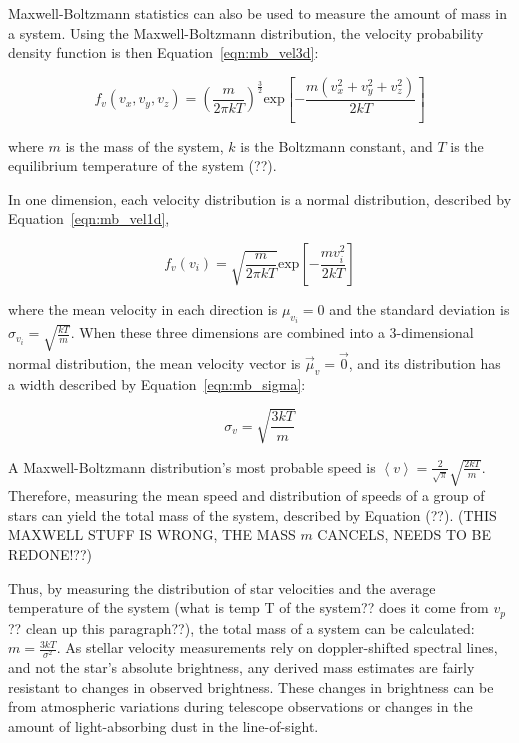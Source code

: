     Maxwell-Boltzmann statistics can also be used to measure the amount of mass in a system.
    Using the Maxwell-Boltzmann distribution, the velocity probability density function is then Equation~\ref{eqn:mb_vel3d}:

    \begin{equation}\label{eqn:mb_vel3d}
      f_v(v_x,v_y,v_z)= \left ( \frac{m}{2\pi k T} \right ) ^ { \frac{3}{2} } \text{exp} \left [ - \frac{m \left ( v_x^2 + v_y^2 + v_z^2 \right )}{2 k T} \right ]
    \end{equation}

    where $m$ is the mass of the system, $k$ is the Boltzmann constant, and $T$ is the equilibrium temperature of the system {\color{red}(??)}.
    
    In one dimension, each velocity distribution is a normal distribution, described by Equation~\ref{eqn:mb_vel1d},

    \begin{equation}\label{eqn:mb_vel1d}
      f_v(v_i) = \sqrt{ \frac{m}{2\pi k T} } \text{exp} \left [ - \frac{m v_i^2}{2kT} \right ]
    \end{equation}

    where the mean velocity in each direction is $\mu_{v_i} = 0$ and the standard deviation is $\sigma_{v_i} = \sqrt{\frac{kT}{m}}$.
    When these three dimensions are combined into a 3-dimensional normal distribution, the mean velocity vector is $\vec{\mu}_v = \vec{0}$, and its distribution has a width described by Equation~\ref{eqn:mb_sigma}:

    \begin{equation}\label{eqn:mb_sigma}
      \sigma_v = \sqrt{\frac{3kT}{m}}
    \end{equation}

    A Maxwell-Boltzmann distribution's most probable speed is $\left \langle v \right \rangle = \frac{2}{\sqrt{\pi}} \sqrt{\frac{2kT}{m}}$.
    Therefore, measuring the mean speed and distribution of speeds of a group of stars can yield the total mass of the system, described by Equation (??).
    {\color{red}(THIS MAXWELL STUFF IS WRONG, THE MASS $m$ CANCELS, NEEDS TO BE REDONE!??)}
    
    Thus, by measuring the distribution of star velocities and the average temperature of the system {\color{red}(what is temp T of the system??  does it come from $v_p$??  clean up this paragraph??)}, the total mass of a system can be calculated: $m = \frac{3kT}{\sigma^2}$.
    As stellar velocity measurements rely on doppler-shifted spectral lines, and not the star's absolute brightness, any derived mass estimates are fairly resistant to changes in observed brightness.
    These changes in brightness can be from atmospheric variations during telescope observations or changes in the amount of light-absorbing dust in the line-of-sight.


